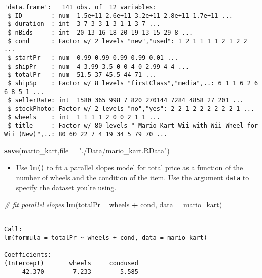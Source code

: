 \documentclass[]{book}
\newenvironment{Shaded}{\begin{snugshade}}{\end{snugshade}}
\newcommand{\KeywordTok}[1]{\textcolor[rgb]{0.13,0.29,0.53}{\textbf{#1}}}
\newcommand{\DataTypeTok}[1]{\textcolor[rgb]{0.13,0.29,0.53}{#1}}
\newcommand{\StringTok}[1]{\textcolor[rgb]{0.31,0.60,0.02}{#1}}
\newcommand{\CommentTok}[1]{\textcolor[rgb]{0.56,0.35,0.01}{\textit{#1}}}
\newcommand{\OperatorTok}[1]{\textcolor[rgb]{0.81,0.36,0.00}{\textbf{#1}}}
\newcommand{\NormalTok}[1]{#1}
\providecommand{\tightlist}{%
  \setlength{\itemsep}{0pt}\setlength{\parskip}{0pt}}
\begin{document}
\begin{verbatim}
'data.frame':   141 obs. of  12 variables:
 $ ID        : num  1.5e+11 2.6e+11 3.2e+11 2.8e+11 1.7e+11 ...
 $ duration  : int  3 7 3 3 1 3 1 1 3 7 ...
 $ nBids     : int  20 13 16 18 20 19 13 15 29 8 ...
 $ cond      : Factor w/ 2 levels "new","used": 1 2 1 1 1 1 2 1 2 2 ...
 $ startPr   : num  0.99 0.99 0.99 0.99 0.01 ...
 $ shipPr    : num  4 3.99 3.5 0 0 4 0 2.99 4 4 ...
 $ totalPr   : num  51.5 37 45.5 44 71 ...
 $ shipSp    : Factor w/ 8 levels "firstClass","media",..: 6 1 1 6 2 6 6 8 5 1 ...
 $ sellerRate: int  1580 365 998 7 820 270144 7284 4858 27 201 ...
 $ stockPhoto: Factor w/ 2 levels "no","yes": 2 2 1 2 2 2 2 2 2 1 ...
 $ wheels    : int  1 1 1 1 2 0 0 2 1 1 ...
 $ title     : Factor w/ 80 levels " Mario Kart Wii with Wii Wheel for Wii (New)",..: 80 60 22 7 4 19 34 5 79 70 ...
\end{verbatim}

\begin{Shaded}
\begin{Highlighting}[]
\KeywordTok{save}\NormalTok{(mario_kart,}\DataTypeTok{file =} \StringTok{"./Data/mario_kart.RData"}\NormalTok{)}
\end{Highlighting}
\end{Shaded}

\begin{itemize}
\tightlist
\item
  Use \texttt{lm()} to fit a parallel slopes model for total price as a
  function of the number of wheels and the condition of the item. Use
  the argument \texttt{data} to specify the dataset you're using.
\end{itemize}

\begin{Shaded}
\begin{Highlighting}[]
\CommentTok{# fit parallel slopes}
\KeywordTok{lm}\NormalTok{(totalPr }\OperatorTok{~}\StringTok{ }\NormalTok{wheels }\OperatorTok{+}\StringTok{ }\NormalTok{cond, }\DataTypeTok{data =}\NormalTok{ mario_kart)}
\end{Highlighting}
\end{Shaded}

\begin{verbatim}

Call:
lm(formula = totalPr ~ wheels + cond, data = mario_kart)

Coefficients:
(Intercept)       wheels     condused  
     42.370        7.233       -5.585  
\end{verbatim}
\end{document}
